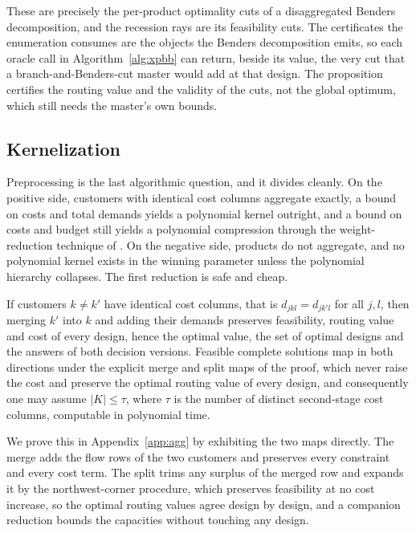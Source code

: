These are precisely the per-product optimality cuts of a disaggregated
Benders decomposition, and the recession rays are its feasibility cuts.
The certificates the enumeration consumes are the objects the Benders
decomposition emits, so each oracle call in Algorithm~\ref{alg:xpbb} can
return, beside its value, the very cut that a branch-and-Benders-cut
master would add at that design. The proposition certifies the routing
value and the validity of the cuts, not the global optimum, which still
needs the master's own bounds.

\subsection{Kernelization}\label{sec:kernel}

Preprocessing is the last algorithmic question, and it divides cleanly.
On the positive side, customers with identical cost columns aggregate
exactly, a bound on costs and total demands yields a polynomial kernel
outright, and a bound on costs and budget still yields a polynomial
compression through the weight-reduction technique of
\citet{FrankTardos1987}. On the negative side, products do not
aggregate, and no polynomial kernel exists in
the winning parameter unless the polynomial hierarchy collapses. The first
reduction is safe and cheap.

\begin{proposition}\label{prop:aggregation}
If customers $k\ne k'$ have identical cost columns, that is
$d_{jkl}=d_{jk'l}$ for all $j,l$, then merging $k'$ into $k$ and adding
their demands preserves feasibility, routing value and cost of every
design, hence the optimal value, the set of optimal designs and the
answers of both decision versions. Feasible complete solutions
map in both directions under the explicit merge and split maps of the
proof, which never raise the cost and preserve the optimal routing
value of every design, and consequently one
may assume $|K|\le\tau$, where $\tau$
is the number of distinct second-stage cost columns, computable in
polynomial time.
\end{proposition}
We prove this in Appendix~\ref{app:agg} by exhibiting the two maps directly. The
merge adds the flow rows of the two customers and preserves every
constraint and every cost term. The split trims any surplus of the
merged row and expands it by the northwest-corner procedure, which
preserves feasibility at no cost increase, so the optimal routing
values agree design by design, and a companion reduction bounds the
capacities without touching any design.

